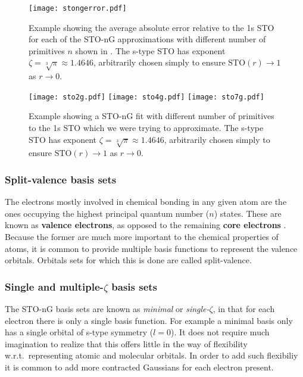 \documentclass[../../master.tex]{subfiles}
\begin{document}
\begin{SCfigure}
\centering
\texttt{[image: stongerror.pdf]}
\caption{Example showing the average absolute error relative to the 1s STO  for each of the STO-nG approximations with different number of primitives $n$ shown in . The s-type STO has exponent $\zeta=\sqrt[3]{\pi}\approx1.4646$, arbitrarily chosen simply to ensure $\text{STO}(r)\rightarrow1$ as $r\rightarrow0$. \label{fig:stoerror}}
\end{SCfigure}



\begin{figure}
\centering
\texttt{[image: sto2g.pdf]}
\texttt{[image: sto4g.pdf]}
\texttt{[image: sto7g.pdf]}
\caption{Example showing a STO-nG fit with different number of primitives to the 1s STO which we were trying to approximate. The s-type STO has exponent $\zeta=\sqrt[3]{\pi}\approx1.4646$, arbitrarily chosen simply to ensure $\text{STO}(r)\rightarrow1$ as $r\rightarrow0$. \label{fig:sto24g}}
\end{figure}

\subsubsection{Split-valence basis sets}
The electrons mostly involved in chemical bonding in any given atom are the ones occupying the highest principal quantum number ($n$) states. These are known as {\bf valence electrons}, as opposed to the remaining {\bf core electrons} \cite{zumdahl}. Because the former are much more important to the chemical properties of atoms, it is common to provide multiple basis functions to represent the valence orbitals. Orbitals sets for which this is done are called split-valence.


\subsubsection{Single and multiple-$\zeta$ basis sets \label{poplebasis}}
The STO-nG basis sets are known as \emph{minimal} or \emph{single-}$\zeta$, in that for each electron there is only a single basis function. For example a minimal  basis only has a single orbital of s-type symmetry ($l=0$). It does not require much imagination to realize that this offers little in the way of flexibility w.r.t.\ representing atomic and molecular orbitals. In order to add such flexibiliy it is common to add more contracted Gaussians for each electron present. 
\end{document}
